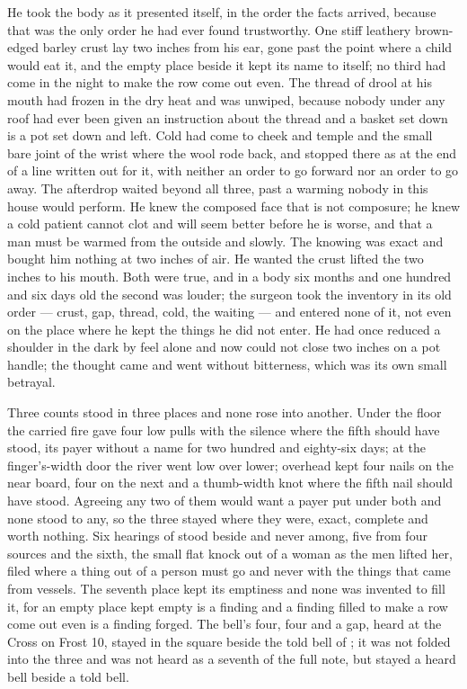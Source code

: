 He took the body as it presented itself, in the order the facts arrived, because that was the only order he had ever found trustworthy. One stiff leathery brown-edged barley crust lay two inches from his ear, gone past the point where a child would eat it, and the empty place beside it kept its name to itself; no third had come in the night to make the row come out even. The thread of drool at his mouth had frozen in the dry heat and was unwiped, because nobody under any roof had ever been given an instruction about the thread and a basket set down is a pot set down and left. Cold had come to cheek and temple and the small bare joint of the wrist where the wool rode back, and stopped there as at the end of a line written out for it, with neither an order to go forward nor an order to go away. The afterdrop waited beyond all three, past a warming nobody in this house would perform. He knew the composed face that is not composure; he knew a cold patient cannot clot and will seem better before he is worse, and that a man must be warmed from the outside and slowly. The knowing was exact and bought him nothing at two inches of air. He wanted the crust lifted the two inches to his mouth. Both were true, and in a body six months and one hundred and six days old the second was louder; the surgeon took the inventory in its old order --- crust, gap, thread, cold, the waiting --- and entered none of it, not even on the place where he kept the things he did not enter. He had once reduced a shoulder in the dark by feel alone and now could not close two inches on a pot handle; the thought came and went without bitterness, which was its own small betrayal.

Three counts stood in three places and none rose into another. Under the floor the carried fire gave four low pulls with the silence where the fifth should have stood, its payer without a name for two hundred and eighty-six days; at the finger's-width door the river went low over lower; overhead  kept four nails on the near board, four on the next and a thumb-width knot where the fifth nail should have stood. Agreeing any two of them would want a payer put under both and none stood to any, so the three stayed where they were, exact, complete and worth nothing. Six hearings of  stood beside and never among, five from four sources and the sixth, the small flat knock out of a woman as the men lifted her, filed where a thing out of a person must go and never with the things that came from vessels. The seventh place kept its emptiness and none was invented to fill it, for an empty place kept empty is a finding and a finding filled to make a row come out even is a finding forged. The bell's four, four and a gap, heard at the Cross on Frost 10, stayed in the square beside the told bell of ; it was not folded into the three and was not heard as a seventh of the full note, but stayed a heard bell beside a told bell.

